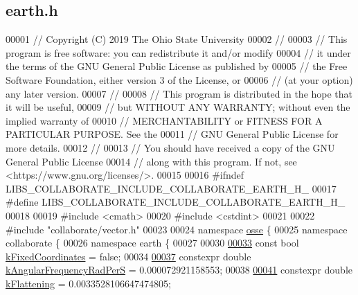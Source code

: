 \hypertarget{earth_8h_source}{}\subsection{earth.\+h}
\label{earth_8h_source}

\begin{DoxyCode}
00001 \textcolor{comment}{// Copyright (C) 2019 The Ohio State University}
00002 \textcolor{comment}{//}
00003 \textcolor{comment}{// This program is free software: you can redistribute it and/or modify}
00004 \textcolor{comment}{// it under the terms of the GNU General Public License as published by}
00005 \textcolor{comment}{// the Free Software Foundation, either version 3 of the License, or}
00006 \textcolor{comment}{// (at your option) any later version.}
00007 \textcolor{comment}{//}
00008 \textcolor{comment}{// This program is distributed in the hope that it will be useful,}
00009 \textcolor{comment}{// but WITHOUT ANY WARRANTY; without even the implied warranty of}
00010 \textcolor{comment}{// MERCHANTABILITY or FITNESS FOR A PARTICULAR PURPOSE.  See the}
00011 \textcolor{comment}{// GNU General Public License for more details.}
00012 \textcolor{comment}{//}
00013 \textcolor{comment}{// You should have received a copy of the GNU General Public License}
00014 \textcolor{comment}{// along with this program.  If not, see <https://www.gnu.org/licenses/>.}
00015 
00016 \textcolor{preprocessor}{#ifndef LIBS\_COLLABORATE\_INCLUDE\_COLLABORATE\_EARTH\_H\_}
00017 \textcolor{preprocessor}{#define LIBS\_COLLABORATE\_INCLUDE\_COLLABORATE\_EARTH\_H\_}
00018 
00019 \textcolor{preprocessor}{#include <cmath>}
00020 \textcolor{preprocessor}{#include <cstdint>}
00021 
00022 \textcolor{preprocessor}{#include "collaborate/vector.h"}
00023 
00024 \textcolor{keyword}{namespace }\hyperlink{namespaceosse}{osse} \{
00025 \textcolor{keyword}{namespace }collaborate \{
00026 \textcolor{keyword}{namespace }earth \{
00027 
00030 
\hyperlink{earth_8h_af8bb9ce2b072050e35c5480bf8296278}{00033} \textcolor{keyword}{const} \textcolor{keywordtype}{bool} \hyperlink{earth_8h_af8bb9ce2b072050e35c5480bf8296278}{kFixedCoordinates} = \textcolor{keyword}{false};
00034 
\hyperlink{earth_8h_a46b6e30d9a4a90f371244acfbdb653c9}{00037} constexpr \textcolor{keywordtype}{double} \hyperlink{earth_8h_a46b6e30d9a4a90f371244acfbdb653c9}{kAngularFrequencyRadPerS} = 0.000072921158553;
00038 
\hyperlink{earth_8h_a7bae303ce017edd85f7b94189c8d50c3}{00041} constexpr \textcolor{keywordtype}{double} \hyperlink{earth_8h_a7bae303ce017edd85f7b94189c8d50c3}{kFlattening} = 0.0033528106647474805;

\end{DoxyCode}
